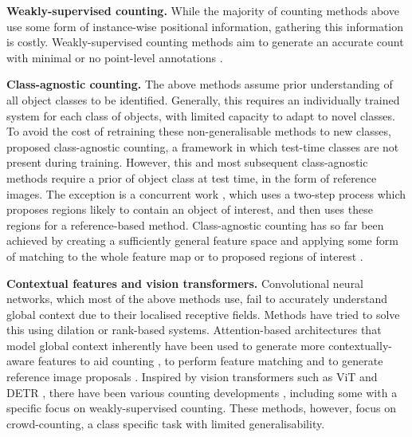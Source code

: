 \documentclass[letterpaper, 11pt]{IEEEtran}
\begin{document}
\textbf{Weakly-supervised counting.} While the majority of counting methods above use some form of instance-wise positional information, gathering this information is costly. 
Weakly-supervised counting methods aim to generate an accurate count with minimal \cite{lei2021towards, sam2019almost} or no point-level annotations \cite{borstel2016gaussian, yang2020weakly, wang2015deep}.

\textbf{Class-agnostic counting.}
The above methods assume prior understanding of all object classes to be identified. 
Generally, this requires an individually trained system for each class of objects, with limited capacity to adapt to novel classes. 
To avoid the cost of retraining these non-generalisable methods to new classes, \citet{Lu18} proposed class-agnostic counting, a framework in which test-time classes are not present during training.
However, this and most subsequent class-agnostic methods \cite{ranjan2021Famnet, yang2021cfoc,sokhandan2020few} require a prior of object class at test time, in the form of reference images. The exception is a concurrent work  \cite{ranjan2022exemplar}, which uses a two-step process which proposes regions likely to contain an object of interest, and then uses these regions for a reference-based method. 
Class-agnostic counting has so far been achieved by creating a sufficiently general feature space and applying some form of matching to the whole feature map \cite{yang2021cfoc, shi2022represent} or to proposed regions of interest \cite{ranjan2021Famnet, sokhandan2020few}.

\textbf{Contextual features and vision transformers.}
Convolutional neural networks, which most of the above methods use, fail to accurately understand global context due to their localised receptive fields. 
Methods have tried to solve this using dilation \cite{li2018csrnet, bai2020adaptive} or rank-based \cite{liu2018leveraging} systems. 
Attention-based architectures that model global context inherently have been used to generate more contextually-aware features to aid counting \cite{sindagi2019ha}, to perform feature matching \cite{shi2022represent, lin2021object} and to generate reference image proposals \cite{ranjan2022exemplar}. 
Inspired by vision transformers such as ViT \cite{dosovitskiy2020vit} and DETR \cite{carion2020DETR}, there have been various counting developments \cite{do2021attention,liang2022end, sun2021boosting}, including some \cite{liang2021transcrowd, savner2022crowdformer, wang2022joint} with a specific focus on weakly-supervised counting. These methods, however, focus on crowd-counting, a class specific task with limited generalisability.
\end{document}
